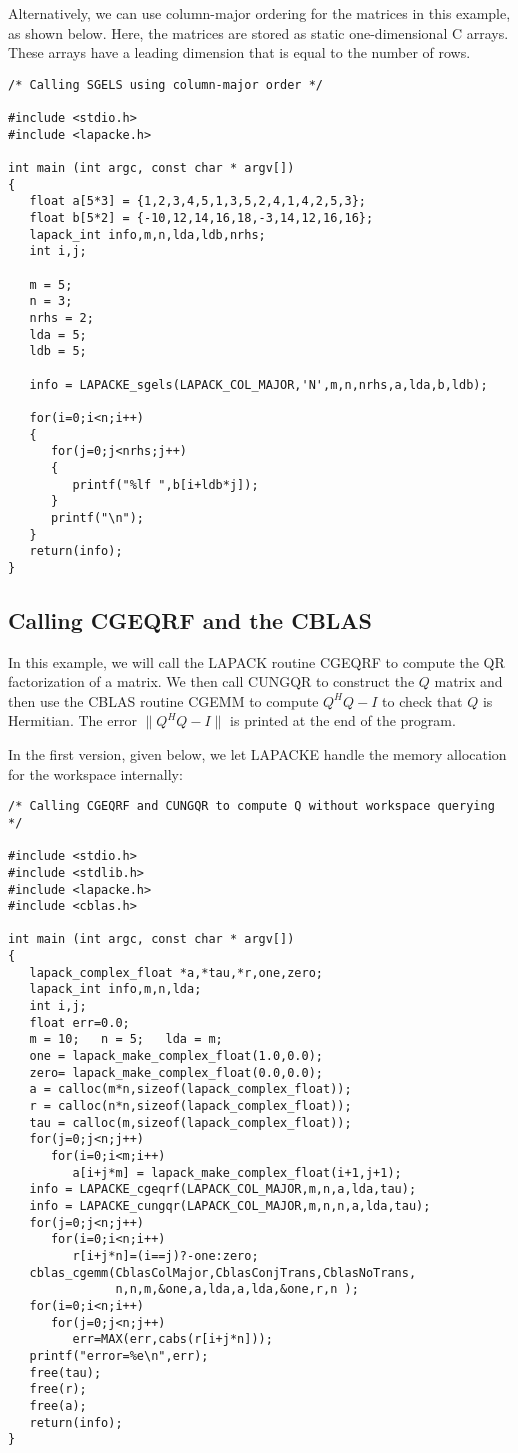 Alternatively, we can use column-major ordering for the matrices in this example, as shown below. Here, the matrices are stored as static one-dimensional C arrays. These arrays have a leading dimension that is equal to the number of rows.

\begin{verbatim}
/* Calling SGELS using column-major order */

#include <stdio.h>
#include <lapacke.h>

int main (int argc, const char * argv[])
{
   float a[5*3] = {1,2,3,4,5,1,3,5,2,4,1,4,2,5,3};
   float b[5*2] = {-10,12,14,16,18,-3,14,12,16,16};
   lapack_int info,m,n,lda,ldb,nrhs;
   int i,j;

   m = 5;
   n = 3;
   nrhs = 2;
   lda = 5;
   ldb = 5;

   info = LAPACKE_sgels(LAPACK_COL_MAJOR,'N',m,n,nrhs,a,lda,b,ldb);

   for(i=0;i<n;i++)
   {
      for(j=0;j<nrhs;j++)
      {
         printf("%lf ",b[i+ldb*j]);
      }
      printf("\n");
   }
   return(info);
}
\end{verbatim}

\subsection{Calling CGEQRF and the CBLAS}

In this example, we will call the LAPACK routine CGEQRF to compute the QR factorization of a matrix. We then call CUNGQR to construct the $Q$ matrix and then use the CBLAS routine CGEMM to compute $Q^{H} Q - I$ to check that $Q$ is Hermitian. The error $\| Q^{H} Q - I \|$ is printed at the end of the program.

In the first version, given below, we let LAPACKE handle the memory allocation for the workspace internally:

\begin{verbatim}
/* Calling CGEQRF and CUNGQR to compute Q without workspace querying */

#include <stdio.h>
#include <stdlib.h>
#include <lapacke.h>
#include <cblas.h>

int main (int argc, const char * argv[])
{
   lapack_complex_float *a,*tau,*r,one,zero;
   lapack_int info,m,n,lda;
   int i,j;
   float err=0.0;
   m = 10;   n = 5;   lda = m;
   one = lapack_make_complex_float(1.0,0.0);
   zero= lapack_make_complex_float(0.0,0.0);
   a = calloc(m*n,sizeof(lapack_complex_float));
   r = calloc(n*n,sizeof(lapack_complex_float));
   tau = calloc(m,sizeof(lapack_complex_float));
   for(j=0;j<n;j++)
      for(i=0;i<m;i++)
         a[i+j*m] = lapack_make_complex_float(i+1,j+1);
   info = LAPACKE_cgeqrf(LAPACK_COL_MAJOR,m,n,a,lda,tau);
   info = LAPACKE_cungqr(LAPACK_COL_MAJOR,m,n,n,a,lda,tau);
   for(j=0;j<n;j++)
      for(i=0;i<n;i++)
         r[i+j*n]=(i==j)?-one:zero;
   cblas_cgemm(CblasColMajor,CblasConjTrans,CblasNoTrans,
               n,n,m,&one,a,lda,a,lda,&one,r,n );
   for(i=0;i<n;i++)
      for(j=0;j<n;j++)
         err=MAX(err,cabs(r[i+j*n]));
   printf("error=%e\n",err);
   free(tau);
   free(r);
   free(a);
   return(info);
}
\end{verbatim}

